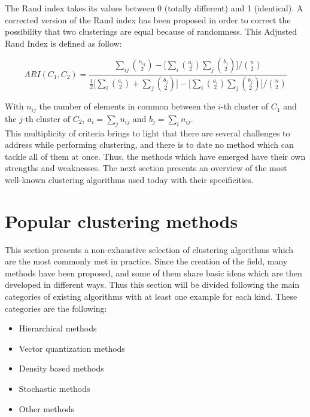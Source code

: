     The Rand index takes its values between 0 (totally different) and 1 (identical). A corrected version of the Rand index has been proposed in order to correct the possibility that two clusterings are equal because of randomness. This Adjusted Rand Index is defined as follow:

    \begin{equation}
        ARI(C_1, C_2) = \frac{\sum_{ij}\binom{n_{ij}}{2} - \big[\sum_i\binom{a_i}{2}\sum_j\binom{b_j}{2}\big]/\binom{n}{2}}{\frac{1}{2}\big[\sum_i\binom{a_i}{2} + \sum_j\binom{b_j}{2}\big] - \big[\sum_i\binom{a_i}{2}\sum_j\binom{b_j}{2}\big]/\binom{n}{2}}
        \label{eq:adj_rand_index}
    \end{equation}

    With $n_{ij}$ the number of elements in common between the $i$-th cluster of $C_1$ and the $j$-th cluster of $C_2$, $a_i = \sum_j n_{ij}$ and $b_j = \sum_i n_{ij}$.\\

    This multiplicity of criteria brings to light that there are several challenges to address while performing clustering, and there is to date no method which can tackle all of them at once. Thus, the methods which have emerged have their own strengths and weaknesses. The next section presents an overview of the most well-known clustering algorithms used today with their specificities.

    \section{Popular clustering methods}

    This section presents a non-exhaustive selection of clustering algorithms which are the most commonly met in practice. Since the creation of the field, many methods have been proposed, and some of them share basic ideas which are then developed in different ways. Thus this section will be divided following the main categories of existing algorithms with at least one example for each kind. These categories are the following:

    \begin{itemize}
        \item Hierarchical methods
        \item Vector quantization methods
        \item Density based methods
        \item Stochastic methods
        \item Other methods 
    \end{itemize}

